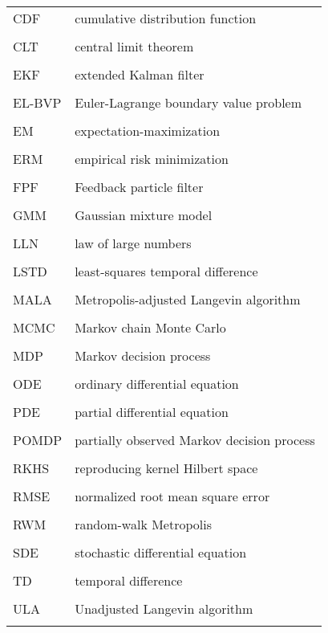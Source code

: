 \begin{tabular}{l p{5in}} %
	CDF & cumulative distribution function \\
	\\
	CLT &  central limit theorem\\
	\\
	EKF & extended Kalman filter \\
	\\
	EL-BVP & Euler-Lagrange boundary value problem\\
	\\
	EM & expectation-maximization\\
	\\
	ERM & empirical risk minimization\\
	\\
	FPF & Feedback particle filter\\
	\\
	GMM & Gaussian mixture model\\
	\\
	LLN & law of large numbers \\
	\\
	LSTD & least-squares temporal difference \\
	\\
	MALA & Metropolis-adjusted Langevin algorithm \\
	\\
	MCMC & Markov chain Monte Carlo \\
	\\
	MDP & Markov decision process \\
	\\
	ODE & ordinary differential equation \\
	\\
	PDE & partial differential equation \\
	\\
	POMDP & partially observed Markov decision process \\
	\\	
	RKHS & reproducing kernel Hilbert space \\
	\\
	RMSE & normalized root mean square error\\
	\\
	RWM & random-walk Metropolis\\
	\\
	SDE & stochastic differential equation\\
	\\
	TD & temporal difference\\
	\\
	ULA & Unadjusted Langevin algorithm \\
	\\
	

\end{tabular}
